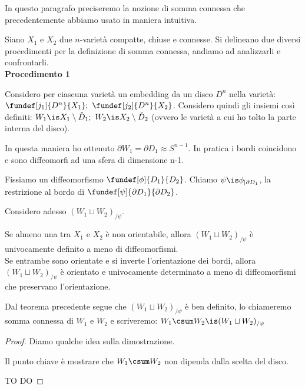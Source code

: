 

In questo paragrafo preciseremo la nozione di somma connessa che precedentemente abbiamo usato in maniera intuitiva.

Siano $X_1$ e $X_2$ due $n$-varietà compatte, chiuse e connesse. Si delineano due diversi procedimenti per la definizione di somma connessa, andiamo ad analizzarli e confrontarli.
\\

\textbf{Procedimento 1}

Considero per ciascuna varietà un embedding da un disco $D^n$ nella varietà:
$	\fundef[j_1]{D^n}{X_1}; ~\fundef[j_2]{D^n}{X_2}$. Considero quindi gli insiemi così definiti: $W_1 \is X_1 \setminus \mathring{D}_1; ~ W_2 \is X_2 \setminus \mathring{D}_2$ (ovvero le varietà a cui ho tolto la parte interna del disco).

In questa maniera ho ottenuto $\partial W_1 = \partial D_1 \approx S^{n-1}$. In pratica i bordi coincidono e sono diffeomorfi ad una sfera di dimensione n-1.

Fissiamo un diffeomorfismo $\fundef[\phi]{D_1}{D_2}$. Chiamo $\psi \is \phi_{|\partial D_1}$, la restrizione al bordo di $\fundef[\psi]{\partial D_1}{\partial D_2}$.

Considero adesso $(W_1 \sqcup W_2)_{/\psi}$.

\begin{teo}
Se almeno una tra $X_1$ e $X_2$ è non orientabile, allora $(W_1 \sqcup W_2)_{/\psi}$ è univocamente definito a meno di diffeomorfismi.\\
Se entrambe sono orientate e si inverte l'orientazione dei bordi, allora $(W_1 \sqcup W_2)_{/\psi}$ è orientato e univocamente determinato a meno di diffeomorfismi che preservano l'orientazione.
\end{teo}

\begin{defn}
Dal teorema precedente segue che $(W_1 \sqcup W_2)_{/\psi}$ è ben definito, lo chiameremo somma connessa di $W_1$ e $W_2$ e scriveremo: $W_1\csum W_2 \is (W_1 \sqcup W_2)_{/\psi}$
\end{defn}

\begin{proof}
Diamo qualche idea sulla dimostrazione.

Il punto chiave è mostrare che $W_1 \csum W_2$ non dipenda dalla scelta del disco.

TO DO
\end{proof}

